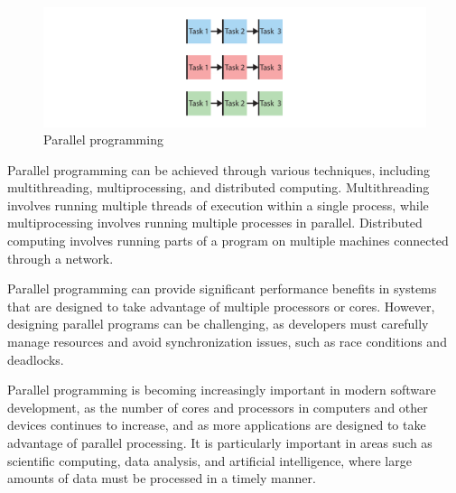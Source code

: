 \begin{figure}[H]
    \centering
    \includegraphics[width=\textwidth]{figures/concurrency/paralell.pdf}
    \caption{Parallel programming}
    \label{fig:concurrency_parallel}
\end{figure}

Parallel programming can be achieved through various techniques, including multithreading, multiprocessing, and distributed computing.
Multithreading involves running multiple threads of execution within a single process, while multiprocessing involves running multiple processes in parallel.
Distributed computing involves running parts of a program on multiple machines connected through a network.

Parallel programming can provide significant performance benefits in systems that are designed to take advantage of multiple processors or cores.
However, designing parallel programs can be challenging, as developers must carefully manage resources and avoid synchronization issues, such as race conditions and deadlocks.

Parallel programming is becoming increasingly important in modern software development, as the number of cores and processors in computers and other devices continues to increase, and as more applications are designed to take advantage of parallel processing.
It is particularly important in areas such as scientific computing, data analysis, and artificial intelligence, where large amounts of data must be processed in a timely manner.


